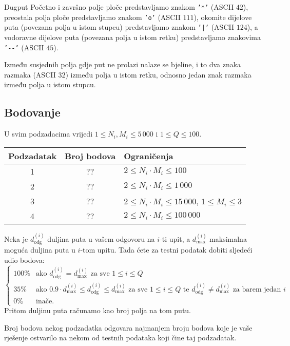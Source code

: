 \begin{statement}[
  problempoints=100,
  timelimit=1 sekunda,
  memorylimit=512 MiB,
]{Dugput}
Početno i završno polje ploče predstavljamo znakom \texttt{'*'} (ASCII $42$),
preostala polja ploče predstavljamo znakom \texttt{'o'} (ASCII $111$),
okomite dijelove puta (povezana polja u istom stupcu) predstavljamo znakom
\texttt{'|'} (ASCII $124$), a vodoravne dijelove puta (povezana polja u istom
retku) predstavljamo znakovima \texttt{'-{}-'} (ASCII $45$).

Između susjednih polja gdje put ne prolazi nalaze se bjeline, i to dva znaka
razmaka (ASCII $32$) između polja u istom retku, odnosno jedan znak razmaka
između polja u istom stupcu.

\subsection*{Bodovanje}
U svim podzadacima vrijedi $1 \leq N_i, M_i \leq 5\,000$ i $1 \leq Q \leq 100$.

{\renewcommand{\arraystretch}{1.4}
  \setlength{\tabcolsep}{6pt}
  \begin{tabular}{ccl}
 Podzadatak & Broj bodova & Ograničenja \\ \midrule
  1 & ?? & $2 \leq N_i \cdot M_i \leq 100$ \\
  2 & ?? & $2 \leq N_i \cdot M_i \leq 1\,000$ \\
  3 & ?? & $2 \leq N_i \cdot M_i \leq 15\,000$, $1 \leq M_i \leq 3$ \\
  4 & ?? & $2 \leq N_i \cdot M_i \leq 100\,000$ \\
\end{tabular}}

Neka je $d_\mathrm{odg}^{(i)}$ duljina puta u vašem odgovoru na $i$-ti upit, a $d_\mathrm{max}^{(i)}$ maksimalna moguća duljina puta u $i$-tom upitu. 
Tada ćete za testni podatak dobiti sljedeći udio bodova:
$$
\begin{cases}
    100\% & \text{ako $d_\mathrm{odg}^{(i)} = d_\mathrm{max}^{(i)}$ za sve $1 \leq i \leq Q$} \\
    35\% & \text{ako $0.9 \cdot d_\mathrm{max}^{(i)} \leq d_\mathrm{odg}^{(i)} \leq d_\mathrm{max}^{(i)}$ za sve $1 \leq i \leq Q$ te $d_\mathrm{odg}^{(i)} \neq d_\mathrm{max}^{(i)}$ za barem jedan $i$} \\
    0\% & \text{inače.}
\end{cases}
$$
Pritom duljinu puta računamo kao broj polja na tom putu.

Broj bodova nekog podzadatka odgovara najmanjem broju
bodova koje je vaše rješenje ostvarilo na nekom od testnih podataka koji čine
taj podzadatak.


\end{statement}
